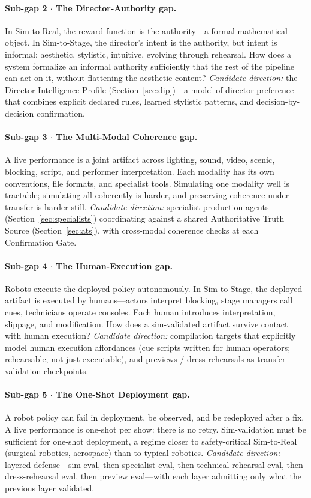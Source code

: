 \documentclass[11pt]{article}
\begin{document}
\paragraph{Sub-gap 2 $\cdot$ The Director-Authority gap.}
In Sim-to-Real, the reward function is the authority---a formal
mathematical object.  In Sim-to-Stage, the director's intent is the
authority, but intent is informal: aesthetic, stylistic, intuitive,
evolving through rehearsal.  How does a system formalize an informal
authority sufficiently that the rest of the pipeline can act on it, without
flattening the aesthetic content?  \textit{Candidate direction:} the
Director Intelligence Profile (Section~\ref{sec:dip})---a model of
director preference that combines explicit declared rules, learned
stylistic patterns, and decision-by-decision confirmation.

\paragraph{Sub-gap 3 $\cdot$ The Multi-Modal Coherence gap.}
A live performance is a joint artifact across lighting, sound, video,
scenic, blocking, script, and performer interpretation.  Each modality has
its own conventions, file formats, and specialist tools.  Simulating one
modality well is tractable; simulating all coherently is harder, and
preserving coherence under transfer is harder still.
\textit{Candidate direction:} specialist production agents
(Section~\ref{sec:specialists}) coordinating against a shared Authoritative
Truth Source (Section~\ref{sec:ats}), with cross-modal coherence checks at
each Confirmation Gate.

\paragraph{Sub-gap 4 $\cdot$ The Human-Execution gap.}
Robots execute the deployed policy autonomously.  In Sim-to-Stage, the
deployed artifact is executed by humans---actors interpret blocking, stage
managers call cues, technicians operate consoles.  Each human introduces
interpretation, slippage, and modification.  How does a sim-validated
artifact survive contact with human execution?
\textit{Candidate direction:} compilation targets that explicitly model
human execution affordances (cue scripts written for human operators;
rehearsable, not just executable), and previews / dress rehearsals as
transfer-validation checkpoints.

\paragraph{Sub-gap 5 $\cdot$ The One-Shot Deployment gap.}
A robot policy can fail in deployment, be observed, and be redeployed
after a fix.  A live performance is one-shot per show: there is no retry.
Sim-validation must be sufficient for one-shot deployment, a regime closer
to safety-critical Sim-to-Real (surgical robotics, aerospace) than to
typical robotics.  \textit{Candidate direction:} layered defense---sim
eval, then specialist eval, then technical rehearsal eval, then
dress-rehearsal eval, then preview eval---with each layer admitting only
what the previous layer validated.
\end{document}
